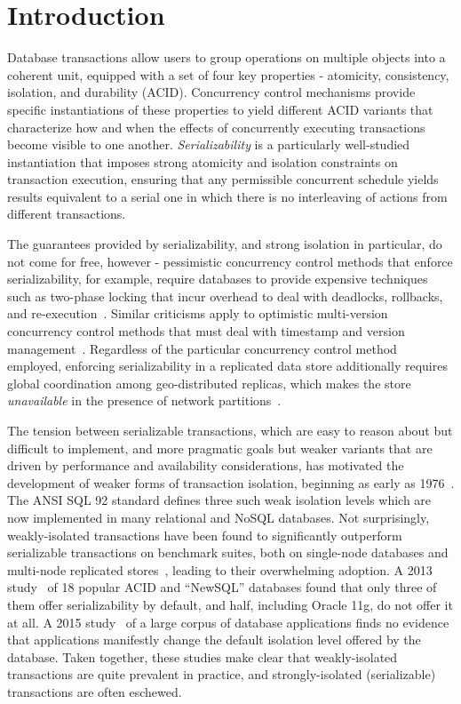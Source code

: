 
\section{Introduction}

Database transactions allow users to group operations on multiple
objects into a coherent unit, equipped with a set of four key
properties - atomicity, consistency, isolation, and durability (ACID).
Concurrency control mechanisms provide specific instantiations of
these properties to yield different ACID variants that characterize
how and when the effects of concurrently executing transactions become
visible to one another.  \emph{Serializability} is a particularly
well-studied instantiation that imposes strong atomicity and isolation
constraints on transaction execution, ensuring that any permissible
concurrent schedule yields results equivalent to a serial one in which
there is no interleaving of actions from different transactions.

The guarantees provided by serializability, and strong isolation in
particular, do not come for free, however - pessimistic concurrency
control methods that enforce serializability, for example, require
databases to provide expensive techniques such as two-phase locking
that incur overhead to deal with deadlocks, rollbacks, and
re-execution~\cite{twopl,ullmanbook}.  Similar criticisms apply to
optimistic multi-version concurrency control methods that must deal
with timestamp and version management~\cite{BG81}.  Regardless of the
particular concurrency control method employed, enforcing
serializability in a replicated data store additionally requires
global coordination among geo-distributed replicas, which makes the
store \emph{unavailable} in the presence of network
partitions~\cite{cap,sernotavlbl,bailishat,bernsigmod13}.

The tension between serializable transactions, which are easy to
reason about but difficult to implement, and more pragmatic goals but
weaker variants that are driven by performance and availability
considerations, has motivated the development of weaker forms of
transaction isolation, beginning as early as 1976~\cite{gray1976}. The
ANSI SQL 92 standard defines three such weak isolation levels which
are now implemented in many relational and NoSQL databases. Not
surprisingly, weakly-isolated transactions have been found to
significantly outperform serializable transactions on benchmark
suites, both on single-node databases and multi-node replicated
stores~\cite{dbtuningbook,bailishat,bailisvldb}, leading to their
overwhelming adoption. A 2013 study~\cite{bailishotos} of 18 popular
ACID and ``NewSQL'' databases found that only three of them offer
serializability by default, and half, including Oracle 11g, do not
offer it at all.  A 2015 study~\cite{bailisferal} of a large corpus of
database applications finds no evidence that applications manifestly
change the default isolation level offered by the database. Taken
together, these studies make clear that weakly-isolated transactions
are quite prevalent in practice, and strongly-isolated (serializable)
transactions are often eschewed.

